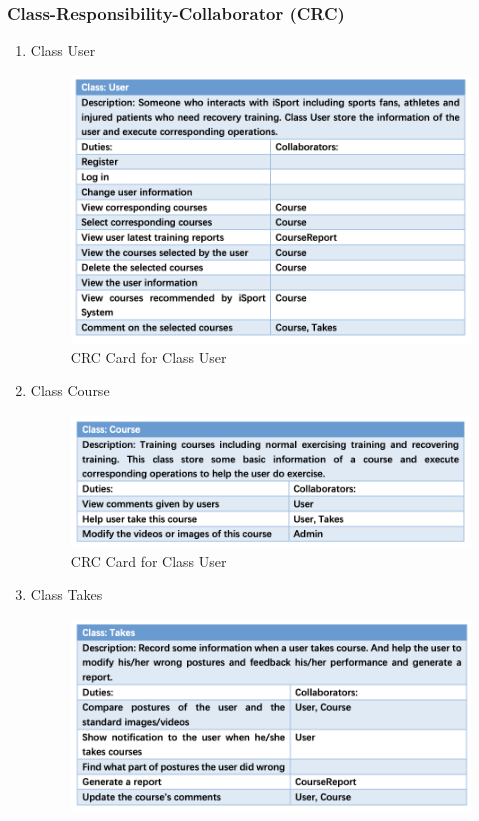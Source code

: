 \documentclass[16pt]{scrreprt}
\begin{document}
\subsubsection{Class-Responsibility-Collaborator (CRC)}
\begin{enumerate}
	\item Class User
		\begin{figure}[H]
			\centering
			\includegraphics[width=1.1\textwidth]{figures/User.png}
			\caption{CRC Card for Class User}
			\label{fig:user}
		\end{figure}
	\item Class Course
		\begin{figure}[H]
			\centering
			\includegraphics[width=1.1\textwidth]{figures/Course.png}
			\caption{CRC Card for Class User}
			\label{fig:course}
		\end{figure}
	\item Class Takes
		\begin{figure}[H]
			\centering
			\includegraphics[width=1.1\textwidth]{figures/Takes.png}

\end{figure}
\end{enumerate}
\end{document}

